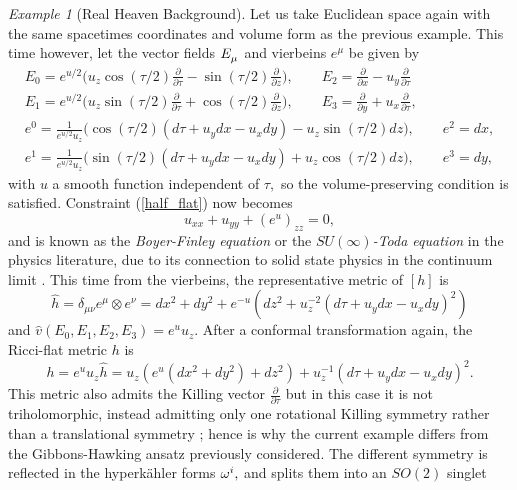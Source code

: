 \documentclass[a4paper,12pt, onecolumn, notitlepage]{article}
\theoremstyle{definition}
\theoremstyle{remark}
\newtheorem{ex}[thm]{Example}
\newcommand{\w}{\omega}
\newcommand{\m}{\mu}
\newcommand{\n}{\nu}
\newcommand{\ddt}[1]{\frac{\partial #1}{\partial \tau}}
\newcommand{\dd}[2]{\frac{\partial #1}{\partial #2}}
\newcommand{\HK}{hyperk\"ahler }
\begin{document}
\begin{ex}[Real Heaven Background]
	Let us take Euclidean space again with the same spacetimes coordinates and volume form as the previous example. This time however, let the vector fields $E\indices{_\m}$ and vierbeins $e^{\m}$ be given by
	\begin{gather*}
		E_{0} = e^{u/2}\bigg(u_{z}\cos(\tau/2)\dd{}{\tau} - \sin(\tau/2)\dd{}{z} \bigg),\qquad E_{2} = \dd{}{x} - u_{y}\dd{}{\tau}\\
		E_{1} = e^{u/2}\bigg(u_{z}\sin(\tau/2)\dd{}{\tau} + \cos(\tau/2)\dd{}{z} \bigg),\qquad E_{3} = \dd{}{y} + u_{x}\dd{}{\tau},\\
		e^{0} = \frac{1}{e^{u/2}u_{z}}\bigg(\cos(\tau/2)(d\tau + u_{y}dx - u_{x}dy) - u_{z}\sin(\tau/2)dz \bigg),\qquad e^{2}=dx,\\
		e^{1} = \frac{1}{e^{u/2}u_{z}}\bigg(\sin(\tau/2)(d\tau + u_{y}dx - u_{x}dy) + u_{z}\cos(\tau/2)dz \bigg),\qquad e^{3}=dy,
	\end{gather*}
	with $u$ a smooth function independent of $\tau,$ so the volume-preserving condition is satisfied. Constraint (\ref{half_flat}) now becomes
	\begin{equation}
	\label{su_infty}
		u_{xx} + u_{yy} + (e^{u})_{zz} = 0,
	\end{equation}
	and is known as the \emph{Boyer-Finley equation} or the $SU(\infty)$\emph{-Toda equation} in the physics literature, due to its connection to solid state physics in the continuum limit \cite{tod_1995, lebrun_1991}. This time from the vierbeins, the representative metric of $[h]$ is
	\begin{equation*}
		\hat{h} = \delta_{\m\n}e^{\m}\otimes e^{\n} = dx^{2}+dy^{2} + e^{-u}(dz^{2} + u_{z}^{-2}(d\tau + u_{y}dx - u_{x}dy)^{2})
	\end{equation*}
	and $\hat{v}(E_{0},E_{1},E_{2},E_{3})=e^{u}u_{z}.$ After a conformal transformation again, the Ricci-flat metric $h$ is
	\begin{equation}
	\label{rh_metric}
	h=e^{u}u_{z}\hat{h}=u_{z}(e^{u}(dx^{2}+dy^{2}) + dz^{2}) + u_{z}^{-1}(d\tau + u_{y}dx - u_{x}dy)^{2}.
	\end{equation}
	This metric also admits the Killing vector $\ddt{}$ but in this case it is not triholomorphic, instead admitting only one rotational Killing symmetry rather than a translational symmetry \cite{park_1990}; hence is why the current example differs from the Gibbons-Hawking ansatz previously considered. The different symmetry is reflected in the \HK forms $\w\indices{^i},$ and splits them into an $SO(2)$ singlet

\end{ex}
\end{document}
